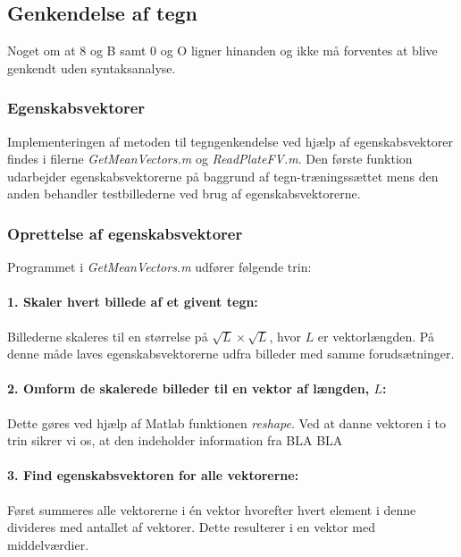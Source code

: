 
\subsection{Genkendelse af tegn}

Noget om at 8 og B samt 0 og O ligner hinanden og ikke må forventes at blive genkendt uden syntaksanalyse.

\subsubsection{Egenskabsvektorer}

Implementeringen af metoden til tegngenkendelse ved hjælp af egenskabsvektorer findes i filerne \textit{GetMeanVectors.m} og \textit{ReadPlateFV.m}. Den første funktion udarbejder egenskabsvektorerne på baggrund af tegn-træningssættet mens den anden behandler testbillederne ved brug af egenskabsvektorerne.

\subsubsection*{Oprettelse af egenskabsvektorer}

Programmet i \textit{GetMeanVectors.m} udfører følgende trin:

\paragraph{1. Skaler hvert billede af et givent tegn:} Billederne skaleres til en størrelse på $\sqrt{L} \times \sqrt{L}$, hvor $L$ er vektorlængden. På denne måde laves egenskabsvektorerne udfra billeder med samme forudsætninger.

\paragraph{2. Omform de skalerede billeder til en vektor af længden, $L$:} Dette gøres ved hjælp af Matlab funktionen \textit{reshape}. Ved at danne vektoren i to trin sikrer vi os, at den indeholder information fra  BLA BLA

\paragraph{3. Find egenskabsvektoren for alle vektorerne:} Først summeres alle vektorerne i én vektor hvorefter hvert element i denne divideres med antallet af vektorer. Dette resulterer i en vektor med middelværdier.

